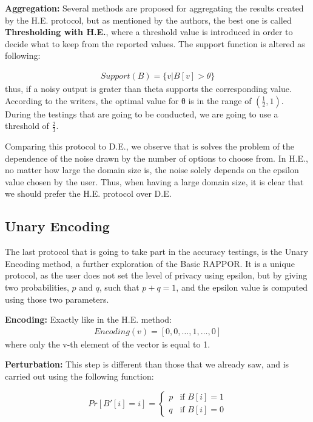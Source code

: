 \textbf{Aggregation:} Several methods are proposed for aggregating the results created by the H.E. protocol, but as mentioned by the authors, the best one is called \textbf{Thresholding with H.E.}, where a threshold value is introduced in order to decide what to keep from the reported values. The support function is altered as following:

\begin{align*}
    Support(B) = \{v | B[v] > \theta\}
\end{align*}
thus, if a noisy output is grater than theta supports the corresponding value. According to the writers, the optimal value for θ is in the range of $(\frac{1}{2}, 1)$. During the testings that are going to be conducted, we are going to use a threshold of $\frac{2}{3}$.


Comparing this protocol to D.E., we observe that is solves the problem of the dependence of the noise drawn by the number of options to choose from. In H.E., no matter how large the domain size is, the noise solely depends on the epsilon value chosen by the user. Thus, when having a large domain size, it is clear that we should prefer the H.E. protocol over D.E.

\subsection{Unary Encoding}

The last protocol that is going to take part in the accuracy testings, is the Unary Encoding method, a further exploration of the Basic RAPPOR. It is a unique protocol, as the user does not set the level of privacy using epsilon, but by giving two probabilities, $p$ and $q$, such that $p+q = 1$, and the epsilon value is computed using those two parameters.

\textbf{Encoding:} Exactly like in the H.E. method:
\begin{align*}
Encoding(v) = [0, 0, \dots, 1, \dots, 0] 
\end{align*}
where only the v-th element of the vector is equal to 1.

\textbf{Perturbation:} This step is different than those that we already saw, and is carried out using the following function:


\begin{equation*}
    Pr[B'[i] = i] =
	\begin{cases}
    	p  & \mbox{if } B[i] = 1 \\
    	q & \mbox{if } B[i] = 0 
	\end{cases}
\end{equation*}

